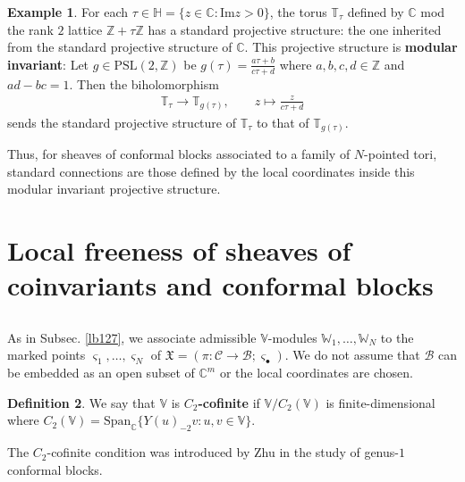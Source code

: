 \documentclass[11pt,b5paper,notitlepage]{article}
\theoremstyle{definition}
\newtheorem{df}{Definition}[section]
\newtheorem{eg}[df]{Example}
\theoremstyle{plain}
\newcommand{\fk}{\mathfrak}
\newcommand{\mc}{\mathcal}
\newcommand{\Span}{\mathrm{Span}}
\newcommand{\sgm}{\varsigma}
\newcommand{\mbb}{\mathbb}
\newcommand{\blt}{\bullet}
\newcommand{\Vbb}{\mathbb V}
\newcommand{\Wbb}{\mathbb W}
\newcommand{\Cbb}{\mathbb C}
\newcommand{\Zbb}{\mathbb Z}
\newcommand{\Hbb}{\mathbb H}
\newcommand{\Imag}{\mathrm{Im}}
\numberwithin{equation}{section}
\begin{document}
\begin{eg}
For each $\tau\in\Hbb=\{z\in\Cbb:\Imag z>0\}$, the torus $\mbb T_\tau$ defined by $\Cbb$ mod the rank $2$ lattice $\Zbb+\tau\Zbb$ has a standard projective structure: the one inherited from the standard projective structure of $\Cbb$. This projective structure is \textbf{modular invariant}: Let $g\in\mathrm{PSL}(2,\Zbb)$ be $g(\tau)=\frac{a\tau+b}{c\tau+d}$ where $a,b,c,d\in\Zbb$ and $ad-bc=1$. Then the biholomorphism
\begin{align*}
\mbb T_\tau\rightarrow\mbb T_{g(\tau)},\qquad z\mapsto\frac{z}{c\tau+d}
\end{align*}
sends the standard projective structure of $\mbb T_\tau$ to that of $\mbb T_{g(\tau)}$.

Thus, for sheaves of conformal blocks associated to a family of $N$-pointed tori, standard connections are those defined by the local coordinates inside this modular invariant projective structure.  \hfill  \qedsymbol
\end{eg}












\section{Local freeness of sheaves of coinvariants and conformal blocks}\label{lb153}



\subsection{}

As in Subsec. \ref{lb127}, we associate admissible $\Vbb$-modules $\Wbb_1,\dots,\Wbb_N$ to the marked points $\sgm_1,\dots,\sgm_N$ of $\fk X=(\pi:\mc C\rightarrow\mc B;\sgm_\blt)$. We do not assume that $\mc B$ can be embedded as an open subset of $\Cbb^m$ or the local coordinates are chosen.
 
\begin{df}
We say that $\Vbb$ is \textbf{$C_2$-cofinite}  if $\Vbb/C_2(\Vbb)$ is finite-dimensional where  $C_2(\Vbb)=\Span_\Cbb\{Y(u)_{-2}v:u,v\in\Vbb\}$.
\end{df}

The $C_2$-cofinite condition was introduced by Zhu \cite{Zhu96} in the study of genus-$1$ conformal blocks.
\end{document}
